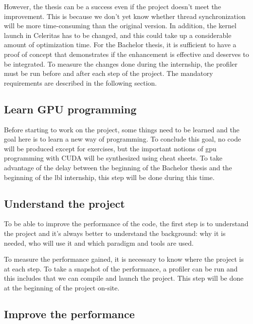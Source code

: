 However, the thesis can be a success even if the project doesn't meet the improvement.
This is because we don't yet know whether thread synchronization will be more
time-consuming than the original version.
In addition, the kernel launch in Celeritas has to be changed, and this
could take up a considerable amount of optimization time.
For the Bachelor thesis, it is sufficient to have a proof of concept that
demonstrates if the enhancement is effective and deserves to be integrated.
To measure the changes done during the internship, the profiler must be run
before and after each step of the project.
The mandatory requirements are described in the following section.

\subsection{Learn GPU programming}
\label{ch:introduction:objectives:learn-gpu-programming}

Before starting to work on the project, some things need to be learned and the goal here is to learn a new way of programming.
To conclude this goal, no code will be produced except for exercises, but the important notions of \acrshort{gpu} programming with CUDA will be synthesized using cheat sheets.
To take advantage of the delay between the beginning of the Bachelor thesis and the beginning of the \acrshort{lbl} internship, this step will be done during this time.


\subsection{Understand the project}
\label{ch:introduction:objectives:understand-the-project}

To be able to improve the performance of the code, the first step is to understand the project and it's always better to understand the background: why it is needed, who will use it and which paradigm and tools are used.

To measure the performance gained, it is necessary to know where the project is at each step.
To take a snapshot of the performance, a profiler can be run and this includes that we can compile and launch the project.
This step will be done at the beginning of the project on-site.


\subsection{Improve the performance}
\label{ch:introduction:objectives:improve-the-performance}

